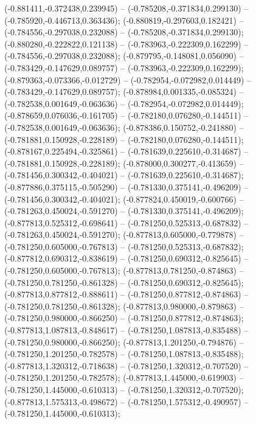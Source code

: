  (-0.881411,-0.372438,0.239945) -- (-0.785208,-0.371834,0.299130) -- (-0.785920,-0.446713,0.363436);
 (-0.880819,-0.297603,0.182421) -- (-0.784556,-0.297038,0.232088) -- (-0.785208,-0.371834,0.299130);
 (-0.880280,-0.222822,0.121138) -- (-0.783963,-0.222309,0.162299) -- (-0.784556,-0.297038,0.232088);
 (-0.879795,-0.148081,0.056090) -- (-0.783429,-0.147629,0.089757) -- (-0.783963,-0.222309,0.162299);
 (-0.879363,-0.073366,-0.012729) -- (-0.782954,-0.072982,0.014449) -- (-0.783429,-0.147629,0.089757);
 (-0.878984,0.001335,-0.085324) -- (-0.782538,0.001649,-0.063636) -- (-0.782954,-0.072982,0.014449);
 (-0.878659,0.076036,-0.161705) -- (-0.782180,0.076280,-0.144511) -- (-0.782538,0.001649,-0.063636);
 (-0.878386,0.150752,-0.241880) -- (-0.781881,0.150928,-0.228189) -- (-0.782180,0.076280,-0.144511);
 (-0.878167,0.225494,-0.325861) -- (-0.781639,0.225610,-0.314687) -- (-0.781881,0.150928,-0.228189);
 (-0.878000,0.300277,-0.413659) -- (-0.781456,0.300342,-0.404021) -- (-0.781639,0.225610,-0.314687);
 (-0.877886,0.375115,-0.505290) -- (-0.781330,0.375141,-0.496209) -- (-0.781456,0.300342,-0.404021);
 (-0.877824,0.450019,-0.600766) -- (-0.781263,0.450024,-0.591270) -- (-0.781330,0.375141,-0.496209);
 (-0.877813,0.525312,-0.698641) -- (-0.781250,0.525313,-0.687832) -- (-0.781263,0.450024,-0.591270);
 (-0.877813,0.605000,-0.779878) -- (-0.781250,0.605000,-0.767813) -- (-0.781250,0.525313,-0.687832);
 (-0.877812,0.690312,-0.838619) -- (-0.781250,0.690312,-0.825645) -- (-0.781250,0.605000,-0.767813);
 (-0.877813,0.781250,-0.874863) -- (-0.781250,0.781250,-0.861328) -- (-0.781250,0.690312,-0.825645);
 (-0.877813,0.877812,-0.888611) -- (-0.781250,0.877812,-0.874863) -- (-0.781250,0.781250,-0.861328);
 (-0.877813,0.980000,-0.879863) -- (-0.781250,0.980000,-0.866250) -- (-0.781250,0.877812,-0.874863);
 (-0.877813,1.087813,-0.848617) -- (-0.781250,1.087813,-0.835488) -- (-0.781250,0.980000,-0.866250);
 (-0.877813,1.201250,-0.794876) -- (-0.781250,1.201250,-0.782578) -- (-0.781250,1.087813,-0.835488);
 (-0.877813,1.320312,-0.718638) -- (-0.781250,1.320312,-0.707520) -- (-0.781250,1.201250,-0.782578);
 (-0.877813,1.445000,-0.619903) -- (-0.781250,1.445000,-0.610313) -- (-0.781250,1.320312,-0.707520);
 (-0.877813,1.575313,-0.498672) -- (-0.781250,1.575312,-0.490957) -- (-0.781250,1.445000,-0.610313);
